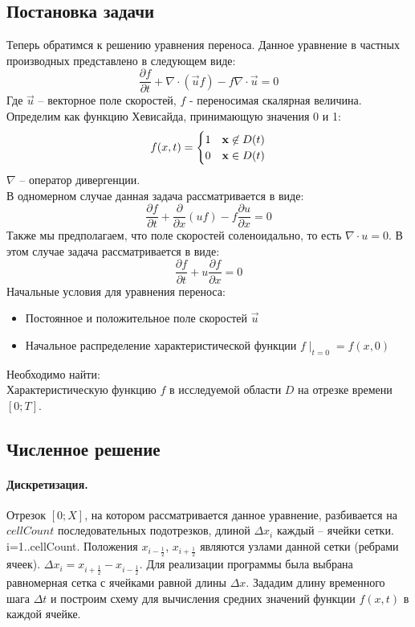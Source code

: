 \documentclass[12pt,a4paper]{article}
\begin{document}
\subsection{Постановка задачи}
Теперь обратимся к решению уравнения переноса.
Данное уравнение в частных производных представлено в следующем виде:
\[
\frac{\partial f}{\partial t}+\nabla\cdot(\overrightarrow{u}f)-f\nabla\cdot\overrightarrow{u}=0
\]
Где $\overrightarrow{u}$ – векторное поле скоростей, $f$ - переносимая скалярная величина. Определим  как функцию Хевисайда, принимающую значения 0 и 1:
\begin{equation}
f(x,t)=\begin{cases}1 & {\bf x}\not\in D(t) \\0 & {\bf x}\in D(t)\end{cases}
\end{equation}
$\nabla$ – оператор дивергенции.\\
В одномерном случае данная задача рассматривается в виде:
\[
\frac{\partial f}{\partial t}+\frac{\partial }{\partial x}(uf)-f\frac{\partial u}{\partial x}=0
\]
Также мы предполагаем, что поле скоростей  соленоидально, то есть $\nabla\cdot u=0$. В этом случае задача рассматривается в виде:
\[
\frac{\partial f}{\partial t}+u\frac{\partial f}{\partial x}=0
\]
Начальные условия для уравнения переноса:
\begin{itemize}
	\item {Постоянное и положительное поле скоростей $\overrightarrow{u}$}
	\item Начальное распределение характеристической функции $f\mid_{t=0}=f(x,0)$
\end{itemize}
Необходимо найти:\\
Характеристическую функцию $f$ в исследуемой области $D$ на отрезке времени $[0; T]$.

\subsection{Численное решение}

\paragraph{Дискретизация.}
Отрезок $[0;X]$, на котором рассматривается данное уравнение, разбивается на $cellCount$ последовательных подотрезков, длиной $\Delta x_i$ каждый – ячейки сетки. i=1..cellCount. Положения $x_{i-\frac{1}{2}}$, $x_{i+\frac{1}{2}}$ являются узлами данной сетки (ребрами ячеек). $\Delta x_i=x_{i+\frac{1}{2}}-x_{i-\frac{1}{2}}$. Для реализации программы была выбрана равномерная сетка с ячейками равной длины $\Delta x$. Зададим длину временного шага $\Delta t$ и построим схему для вычисления средних значений функции $f(x,t)$ в каждой ячейке.\\
\end{document}
